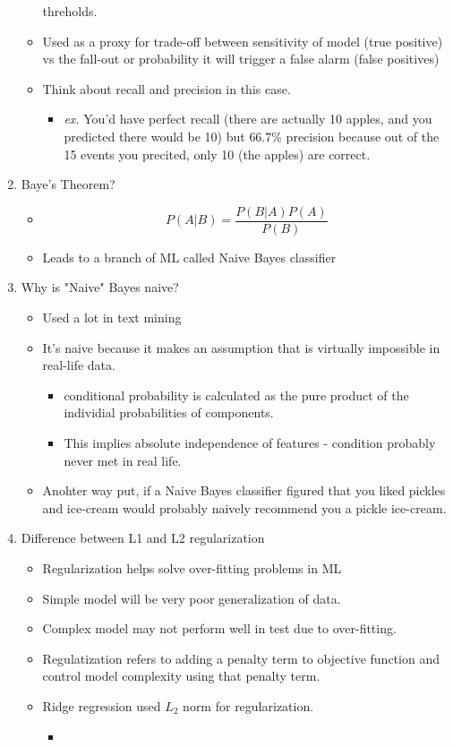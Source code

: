 \documentclass[12pt,a4paper]{article}
\begin{document}
\begin{enumerate}
\begin{itemize}
            threholds. 
      \item Used as a proxy for trade-off between sensitivity of model (true positive) vs the 
            fall-out or probability it will trigger a false alarm (false positives)
      \item Think about recall and precision in this case.
        \begin{itemize}
          \item \textit{ex. } You'd have perfect recall (there are actually 10 apples, and you 
                predicted there would be 10) but $66.7\%$ precision because out of the 15 events 
                you precited, only 10 (the apples) are correct.
        \end{itemize}
    \end{itemize}
    \item  Baye's Theorem?
    \begin{itemize}
      \item $$P(A|B) = \frac{P(B|A)P(A)}{P(B)}$$
      \item Leads to a branch of ML called Naive Bayes classifier
    \end{itemize}
    \item Why is "Naive" Bayes naive?
    \begin{itemize}
      \item Used a lot in text mining
      \item It's naive because it makes an assumption that is virtually impossible in real-life data. 
      \begin{itemize}
        \item conditional probability is calculated as the pure product of the individial probabilities of components.
        \item This implies absolute independence of features - condition probably never met in real life.
      \end{itemize}
      \item Anohter way put, if a Naive Bayes classifier figured that you liked pickles and ice-cream 
            would probably naively recommend you a pickle ice-cream.
    \end{itemize}
    \item Difference between L1 and L2 regularization
    \begin{itemize}
      \item Regularization helps solve over-fitting problems in ML
      \item Simple model will be very poor generalization of data. 
      \item Complex model may not perform well in test due to over-fitting.
      \item Regulatization refers to adding a penalty term to objective function and control model complexity using 
            that penalty term. 
      \item Ridge regression used $L_2$ norm for regularization.
      \begin{itemize}
        \item 
      \end{itemize}
    \end{itemize}
\end{enumerate}
\noindent\hrulefill
\end{document}
